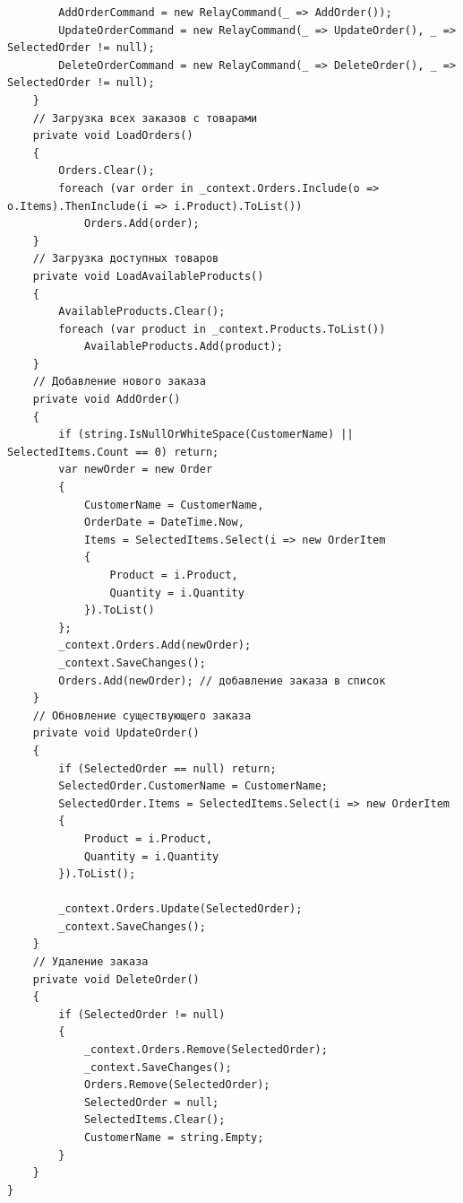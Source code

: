 \documentclass[12pt]{article}
\newenvironment{code}{\captionsetup{type=listing}}{}
\numberwithin{listing}{section}
\numberwithin{figure}{section}
\begin{document}
\begin{code}
\begin{verbatim}
        AddOrderCommand = new RelayCommand(_ => AddOrder());
        UpdateOrderCommand = new RelayCommand(_ => UpdateOrder(), _ => SelectedOrder != null);
        DeleteOrderCommand = new RelayCommand(_ => DeleteOrder(), _ => SelectedOrder != null);
    }
    // Загрузка всех заказов с товарами
    private void LoadOrders()
    {
        Orders.Clear();
        foreach (var order in _context.Orders.Include(o => o.Items).ThenInclude(i => i.Product).ToList())
            Orders.Add(order);
    }
    // Загрузка доступных товаров
    private void LoadAvailableProducts()
    {
        AvailableProducts.Clear();
        foreach (var product in _context.Products.ToList())
            AvailableProducts.Add(product);
    }
    // Добавление нового заказа
    private void AddOrder()
    {
        if (string.IsNullOrWhiteSpace(CustomerName) || SelectedItems.Count == 0) return;
        var newOrder = new Order
        {
            CustomerName = CustomerName,
            OrderDate = DateTime.Now,
            Items = SelectedItems.Select(i => new OrderItem
            {
                Product = i.Product,
                Quantity = i.Quantity
            }).ToList()
        };
        _context.Orders.Add(newOrder);
        _context.SaveChanges();
        Orders.Add(newOrder); // добавление заказа в список
    }
    // Обновление существующего заказа
    private void UpdateOrder()
    {
        if (SelectedOrder == null) return;
        SelectedOrder.CustomerName = CustomerName;
        SelectedOrder.Items = SelectedItems.Select(i => new OrderItem
        {
            Product = i.Product,
            Quantity = i.Quantity
        }).ToList();

        _context.Orders.Update(SelectedOrder);
        _context.SaveChanges();
    }
    // Удаление заказа
    private void DeleteOrder()
    {
        if (SelectedOrder != null)
        {
            _context.Orders.Remove(SelectedOrder);
            _context.SaveChanges();
            Orders.Remove(SelectedOrder);
            SelectedOrder = null;
            SelectedItems.Clear();
            CustomerName = string.Empty;
        }
    }
}
    \end{verbatim}
	\label{lst:OrderViewModel}
\end{code}
\end{document}
